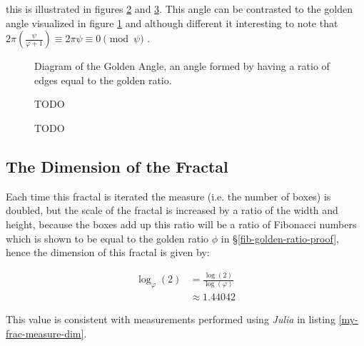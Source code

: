 \documentclass[a4paper,11pt,twoside]{article}
\begin{document}
this is illustrated in figures \ref{My-Frac-ink-blue} and \ref{My-Frac-ink-fade}. This angle can be contrasted to the golden angle visualized in figure \ref{My-Frac-gold-angle} and although different it interesting to note that \(2 \pi\left( \frac{\psi}{\varphi+1}\right) \equiv 2 \pi \psi \equiv 0 \pmod \psi\)
.


\begin{figure}
\centering

\caption{\label{My-Frac-gold-angle}Diagram of the Golden Angle, an angle formed by having a ratio of edges equal to the golden ratio.}
\end{figure}


\begin{figure}[htbp]
\centering

\caption{\label{My-Frac-ink-blue}TODO}
\end{figure}


\begin{figure}[htbp]
\centering

\caption{\label{My-Frac-ink-fade}TODO}
\end{figure}


\subsection{The Dimension of the Fractal}
\label{sec:org0e13946}
Each time this fractal is iterated the measure (i.e. the number of boxes) is doubled, but the scale of the fractal is increased by a ratio of the width and height, because the boxes add up this ratio will be a ratio of Fibonacci numbers which is shown to be equal to the golden ratio \(\phi\) in \S \ref{fib-golden-ratio-proof}, hence the dimension of this fractal is given by:

\begin{align}
\log_{\varphi}\left(2\right) &= \frac{\log (2)}{\log (\varphi)} \\
&\approx 1.44042
\end{align}

This value is consistent with measurements performed using \emph{Julia} in listing \ref{my-frac-measure-dim}.
\end{document}

